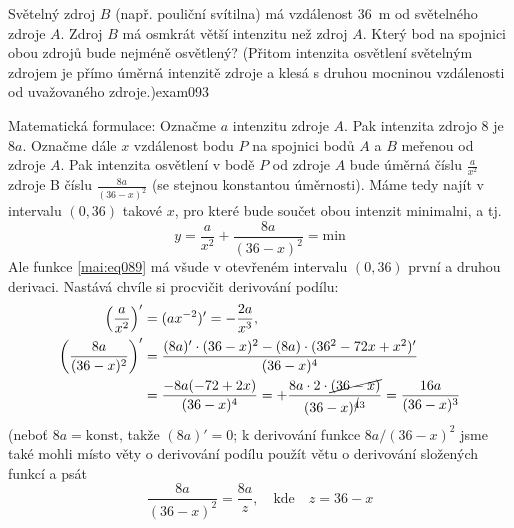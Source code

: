 \begin{mathexam}{Světelný zdroj \(B\) (např. pouliční svítilna) má vzdálenost \SI{36}{\m} od
  světelného zdroje \(A\). Zdroj \(B\) má osmkrát větší intenzitu než zdroj \(A\). Který bod na
  spojnici obou zdrojů bude nejméně osvětlený? (Přitom intenzita osvětlení světelným zdrojem je
  přímo úměrná intenzitě zdroje a klesá s druhou mocninou vzdálenosti od uvažovaného
  zdroje.)}{exam093} 
  
  {\centering
    \captionsetup{type=figure}
    \label{mai:fig063}
  \par}      

  Matematická formulace: Označme \(a\) intenzitu zdroje \(A\). Pak intenzita zdrojo \(8\) je \(8a\).
  Označme dále \(x\) vzdálenost bodu \(P\) na spojnici bodů \(A\) a \(B\) meřenou od zdroje \(A\).
  Pak intenzita osvětlení v bodě \(P\) od zdroje \(A\) bude úměrná číslu \(\frac{a}{x^2}\) zdroje B
  číslu \(\frac{8a}{(36 - x)^2}\) (se stejnou konstantou úměrnosti). Máme tedy najít v intervalu
  \((0,36)\) takové \(x\), pro které bude součet obou intenzit minimalni, a tj.
  \begin{equation}\label{mai:eq089}
    y = \dfrac{a}{x^2} + \dfrac{8a}{(36 - x)^2} = \text{min}
  \end{equation}
  Ale funkce \ref{mai:eq089} má všude v otevřeném intervalu  \((0,36)\) první a druhou derivaci.
  Nastává chvíle si procvičit derivování podílu:
  \begin{gather*}
    \begin{align*} 
      \left(\dfrac{a}{x^2}\right)'          
        &= (ax^{-2})' = -\dfrac{2a}{x^3},   \\ 
      \left( \dfrac{8a}{(36 - x)^2}\right)' 
        &= \dfrac{(8a)'\cdot(36 - x)^2 - (8a)\cdot(36^2 - 72x + x^2)'}{(36 - x)^4} \\
        &= \dfrac{-8a(-72 + 2x)}{(36 - x)^4} 
         = +\dfrac{8a\cdot2\cdot\cancel{(36 - x)}}{(36 - x)^{\cancel{4}3}}
         =  \dfrac{16a}{(36 - x)^3}
    \end{align*}
  \end{gather*}
  (neboť \(8a = \text{konst}\), takže \((8a)' = 0\); k derivování funkce \(8a/(36 - x)^2\) jsme také
  mohli místo věty o derivování podílu použít větu o derivování složených funkcí a psát
  \begin{equation*}
    \dfrac{8a}{(36 - x)^2} = \dfrac{8a}{z}, \quad\text{kde}\quad z = 36 - x

\end{equation*}
\end{mathexam}
